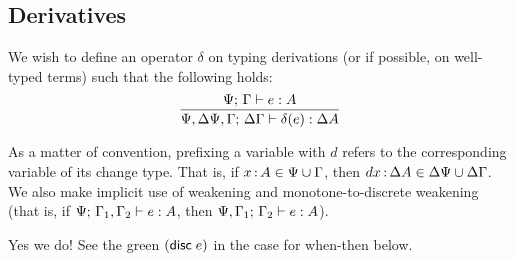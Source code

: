 \documentclass{article}
\begin{document}

\subsection{Derivatives}

We wish to define an operator $\delta$ on typing derivations (or if possible, on
well-typed terms) such that the following holds:
\[\infer{\J{\GP,\GD\GP,\GG}{\GD\GG}{\delta(e)}{\Delta A}}
        {\J{\GP}{\GG}{e}{A}}
\]

As a matter of convention, prefixing a variable with $d$ refers to the
corresponding variable of its change type. That is, if $x \,{:}\, A \in \Psi \cup
\Gamma$, then $dx \,{:}\, \Delta A \in \Delta\Psi \cup \Delta\Gamma$. We also make implicit use of
weakening and monotone-to-discrete weakening (that is, if
${\Psi};\,{\Gamma_1,\Gamma_2}\vdash {e}:{A}$, then ${\Psi,\Gamma_1};\,{\Gamma_2}\vdash {e}:{A}$).

 {\color{ForestGreen} Yes we do!
  See the green $(\mathsf{disc}\;{e})$ in the case for \textsf{when-then} below.}
\end{document}
